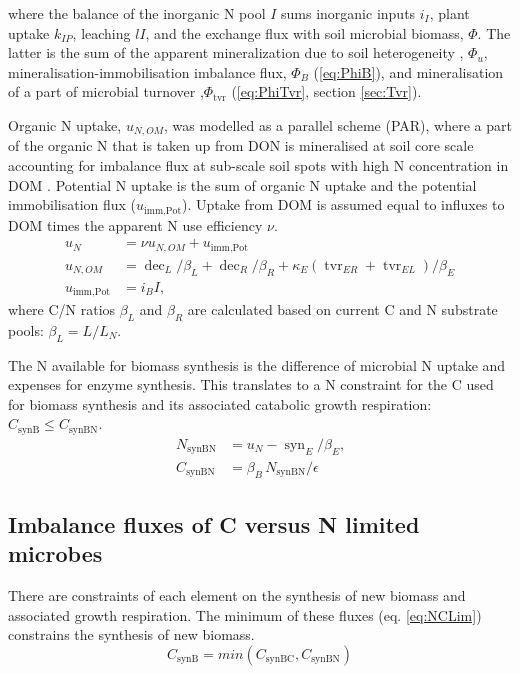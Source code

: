 \noindent where the balance of the inorganic N pool $I$ sums inorganic
inputs $i_I$, plant uptake $k_{IP}$, leaching $l I$, and the exchange flux with
soil microbial biomass, $\Phi$. The latter is the sum of the
apparent mineralization
due to soil heterogeneity \citep{Manzoni08}, $\Phi_u$, mineralisation-immobilisation
imbalance flux, $\Phi_B$ (\ref{eq:PhiB}), and mineralisation of a part of microbial
turnover ,$\Phi_{\operatorname{tvr}}$ (\ref{eq:PhiTvr}, section \ref{sec:Tvr}).

Organic N uptake, $u_{N,OM}$, was modelled as a parallel scheme (PAR),
where a part of the organic N that is taken up from DON is mineralised
at soil core scale accounting for imbalance flux at sub-scale soil
spots with high N concentration in DOM \citep{Manzoni08}.
Potential N uptake is the sum of organic N uptake and the potential
immobilisation flux ($u_{\operatorname{imm,Pot}}$). Uptake from DOM is assumed
equal to influxes to DOM times the apparent N use efficiency $\nu$.
\begin{subequations}
\label{eq:uN}
\begin{align}
u_N &= \nu u_{N,OM} + u_{\operatorname{imm,Pot}}
\\
u_{N,OM} &= \operatorname{dec}_L/\beta_L + \operatorname{dec}_R/\beta_R +
\kappa_E (\operatorname{tvr}_{ER} + \operatorname{tvr}_{EL})/\beta_E
\\
u_{\operatorname{imm,Pot}} &= i_B I 
\text{,}
\end{align}
\end{subequations}
where C/N ratios $\beta_L$ and $\beta_R$ are calculated based on current C
and N substrate pools: $\beta_L = L/L_N$.  

The N available for biomass synthesis is the difference of microbial N
uptake and expenses for enzyme synthesis. This translates to a N
constraint for the C used for biomass synthesis and its associated
catabolic growth respiration: $C_{\operatorname{synB}} \le
C_{\operatorname{synBN}}$.
\begin{subequations}
\label{eq:synBN}
\begin{align}
N_{\operatorname{synBN}} &= u_N - \operatorname{syn}_E/\beta_E \text{,} \\
C_{\operatorname{synBN}} &= \beta_B \, N_{\operatorname{synBN}}  / \epsilon
\end{align}
\end{subequations}


\subsection{Imbalance fluxes of C versus N limited microbes }
There are constraints of each element on the synthesis of new
biomass and associated growth respiration. The minimum of these fluxes (eq.
\ref{eq:NCLim}) constrains the synthesis of new biomass. 
\begin{equation}
\label{eq:NCLim} 
C_{\operatorname{synB}} =
min(C_{\operatorname{synBC}}, C_{\operatorname{synBN}} )
\end{equation}

